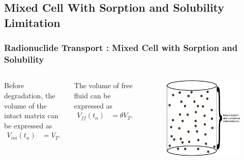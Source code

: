 

\subsection{Mixed Cell With Sorption and Solubility Limitation}
\begin{frame}
  \frametitle{Radionuclide Transport : Mixed Cell with Sorption and Solubility}
  \footnotesize{
  \begin{columns}[c]
Before degradation, the volume of the intact matrix can be expressed as
\begin{align}
V_{im}(t_n) &= V_T.
\end{align}

The volume of free fluid can be expressed as
\begin{align}
V_{ff}(t_n) &= \theta V_T .
\end{align}

  \begin{figure}[h!]
    \begin{center}
      \includegraphics[width=\textwidth]{cyder/images/mixed_cell_whole.eps}
    \end{center}
  \end{figure}
\end{columns}
    }
\end{frame}

